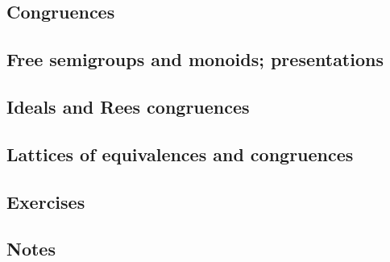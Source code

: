 \subsection[5]{Congruences}
\subsection[6]{Free semigroups and monoids; presentations}
\subsection[7]{Ideals and Rees congruences}
\subsection[8]{Lattices of equivalences and congruences}
\subsection[9]{Exercises}
\subsection[10]{Notes}